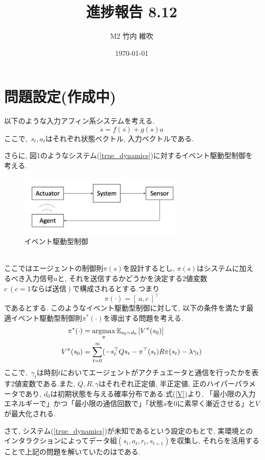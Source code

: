 \documentclass{jsarticle}
\title{\large{\bf{進捗報告 8.12}}}
\author{M2 竹内 維吹}
\date{\today}
\newcommand{\argmax}{\mathop{\rm argmax}\limits}
\newcommand{\expect}{\mathbb{E}}
\begin{document}
\maketitle


\section{問題設定(作成中)}
以下のような入力アフィン系システムを考える.
\begin{equation}
	\dot{s}=f(s)+g(s)a \label{true_dynamics}
\end{equation}
ここで,~$s_t, a_t$はそれぞれ状態ベクトル, 入力ベクトルである.\par
さらに, 図1のようなシステム(\ref{true_dynamics})に対するイベント駆動型制御を考える.
\begin{figure}[h]
	\centering
 	\includegraphics[width=8cm]{event.png}
 	\caption{イベント駆動型制御}
\end{figure}\\
ここではエージェントの制御則$\pi(s)$を設計するとし, $\pi(s)$はシステムに加えるべき入力信号$a$と, それを送信するかどうかを決定する2値変数$c~(c = 1 ならば送信)$で構成されるとする.つまり
\begin{equation}
	\pi(\cdot) = [~a, c~]^{\top}
\end{equation}
であるとする. このようなイベント駆動型制御に対して, 以下の条件を満たす最適イベント駆動型制御則$\pi^{*}(\cdot)$を導出する問題を考える.
\begin{align}
	\pi^{*}(\cdot) &= \argmax_{\pi}\expect_{s_0 \sim d_0}\left[V^{\pi} (s_0)\right] \label{optimal_policy}\\
	V^{\pi} (s_0) &=\sum_{t=0}^{\infty}(-s_t^{\top}Qs_t - \pi^{\top}(s_t)R\pi(s_t) - \lambda\gamma_t) \label{V}
\end{align}
ここで,~$\gamma_t$は時刻$t$においてエージェントがアクチュエータと通信を行ったかを表す2値変数である.また, $Q,R,\gamma$はそれぞれ正定値, 半正定値, 正のハイパーパラメータであり, $d_0$は初期状態を与える確率分布である.式(\ref{V})より, 「最小限の入力エネルギーで」かつ「最小限の通信回数で」「状態$s$を0に素早く漸近させる」と$V$が最大化される.\par
さて, システム(\ref{true_dynamics})が未知であるという設定のもとで, 実環境とのインタラクションによってデータ組$(s_t, a_t, r_t, s_{t+1})$を収集し, それらを活用することで上記の問題を解いていたのは\cite{event}である.\par
\end{document}
